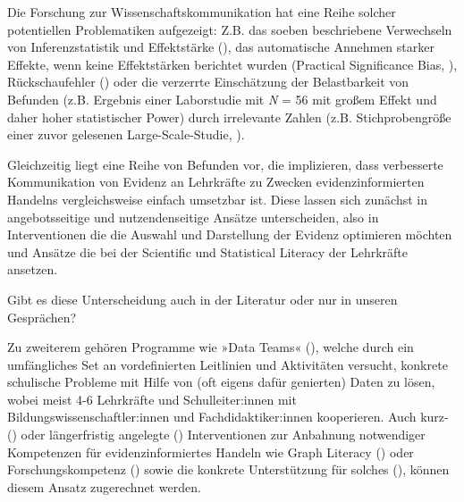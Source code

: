 \documentclass[
  jou,
  floatsintext,
  longtable,
  nolmodern,
  notxfonts,
  notimes,
  colorlinks=true,linkcolor=blue,citecolor=blue,urlcolor=blue]{apa7}
\begin{document}
Die Forschung zur Wissenschaftskommunikation hat eine Reihe solcher
potentiellen Problematiken aufgezeigt: Z.B. das soeben beschriebene
Verwechseln von Inferenzstatistik und Effektstärke
(), das automatische
Annehmen starker Effekte, wenn keine Effektstärken berichtet wurden
(Practical Significance Bias, ), Rückschaufehler () oder die verzerrte Einschätzung der Belastbarkeit von
Befunden (z.B. Ergebnis einer Laborstudie mit \emph{N} = 56 mit großem
Effekt und daher hoher statistischer Power) durch irrelevante Zahlen
(z.B. Stichprobengröße einer zuvor gelesenen Large-Scale-Studie,
).

Gleichzeitig liegt eine Reihe von Befunden vor, die implizieren, dass
verbesserte Kommunikation von Evidenz an Lehrkräfte zu Zwecken
evidenzinformierten Handelns vergleichsweise einfach umsetzbar ist.
Diese lassen sich zunächst in angebotsseitige und nutzendenseitige
Ansätze unterscheiden, also in Interventionen die die Auswahl und
Darstellung der Evidenz optimieren möchten und Ansätze die bei der
Scientific und Statistical Literacy der Lehrkräfte ansetzen.

\begin{tcolorbox}[enhanced jigsaw, leftrule=.75mm, opacityback=0, arc=.35mm, bottomtitle=1mm, coltitle=black, colframe=quarto-callout-caution-color-frame, toprule=.15mm, opacitybacktitle=0.6, colbacktitle=quarto-callout-caution-color!10!white, colback=white, toptitle=1mm, titlerule=0mm, left=2mm, rightrule=.15mm, breakable, bottomrule=.15mm, title=\textcolor{quarto-callout-caution-color}{\faFire}\hspace{0.5em}{Vorsicht}]

Gibt es diese Unterscheidung auch in der Literatur oder nur in unseren
Gesprächen?

\end{tcolorbox}

Zu zweiterem gehören Programme wie »Data Teams«
(), welche
durch ein umfängliches Set an vordefinierten Leitlinien und Aktivitäten
versucht, konkrete schulische Probleme mit Hilfe von (oft eigens dafür
genierten) Daten zu lösen, wobei meist 4-6 Lehrkräfte und
Schulleiter:innen mit Bildungswissenschaftler:innen und
Fachdidaktiker:innen kooperieren. Auch kurz-
() oder längerfristig
angelegte () Interventionen
zur Anbahnung notwendiger Kompetenzen für evidenzinformiertes Handeln
wie Graph Literacy () oder
Forschungskompetenz () sowie die konkrete Unterstützung für solches
(), können diesem Ansatz
zugerechnet werden.
\end{document}
